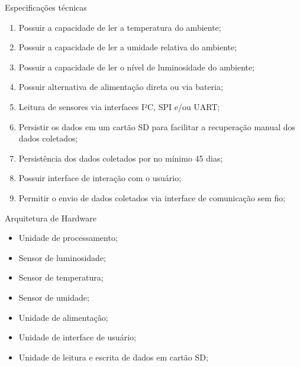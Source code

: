 \begin{frame}{Especificações técnicas}

    \begin{enumerate}
        \item Possuir a capacidade de ler a temperatura do ambiente;
        \item Possuir a capacidade de ler a umidade relativa do ambiente;
        \item Possuir a capacidade de ler o nível de luminosidade do ambiente;
        \item Possuir alternativa de alimentação direta ou via bateria;
        \item Leitura de sensores via interfaces I²C, SPI e/ou UART;
        \item Persistir os dados em um cartão SD para facilitar a recuperação manual dos dados coletados;
        \item Persistência dos dados coletados por no mínimo 45 dias;
        \item Possuir interface de interação com o usuário;
        \item Permitir o envio de dados coletados via interface de comunicação sem fio;
    \end{enumerate}
    
\end{frame}


\begin{frame}{Arquitetura de Hardware}
    
     \begin{itemize}
     \item Unidade de processamento;
     \item Sensor de luminosidade;
     \item Sensor de temperatura; 
     \item Sensor de umidade;
     \item Unidade de alimentação;
     \item Unidade de interface de usuário;
     \item Unidade de leitura e escrita de dados em cartão SD;
     
    
      \end{itemize}
 \end{frame}
      
